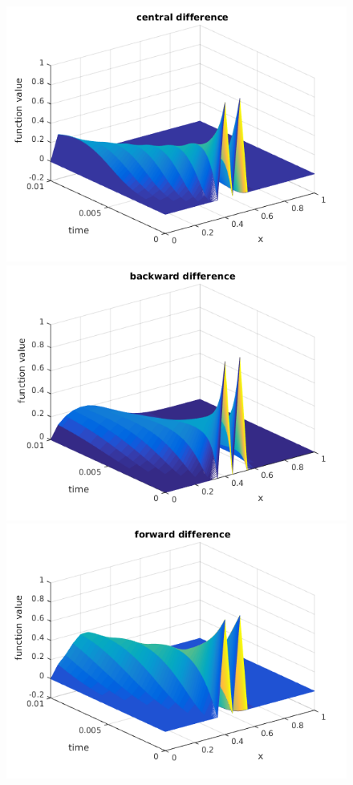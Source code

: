 \documentclass[ twoside,openright,titlepage,numbers=noenddot,headinclude,%
                footinclude=true,cleardoublepage=empty,abstractoff, %
                BCOR=5mm,paper=a4,fontsize=11pt,%
                ngerman,american,%
                ]{scrreprt}
\begin{document}
\begin{figure}
\includegraphics[scale = 0.45]{images/centralDifference.png}
\includegraphics[scale = 0.45]{images/backwardDifference.png}
\includegraphics[scale = 0.45]{images/forwardDifference.png}
\end{figure}
\end{document}
